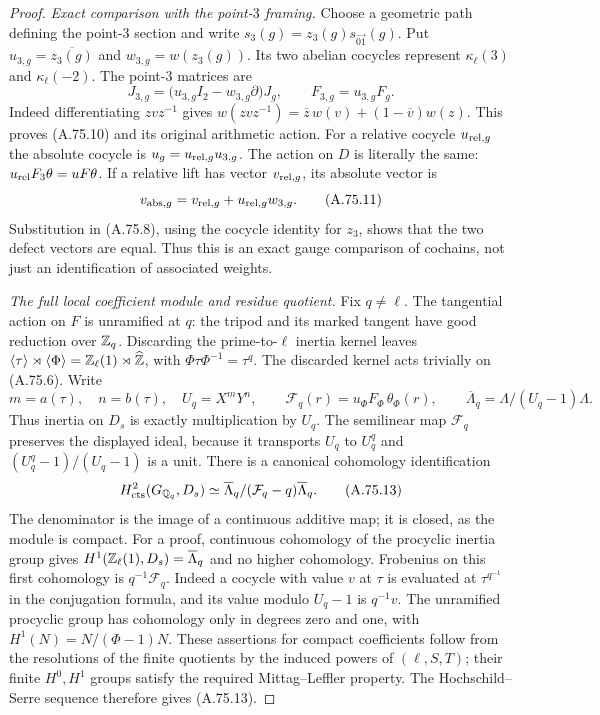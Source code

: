 \begin{proof}
\emph{Exact comparison with the point-$3$ framing.}
Choose a geometric path defining the point-$3$ section and write
$s_3(g)=z_3(g)s_{\overrightarrow{01}}(g)$.
Put $u_{3,g}=\overline{z_3(g)}$ and $w_{3,g}=w(z_3(g))$.
Its two abelian cocycles represent $\kappa_\ell(3)$ and
$\kappa_\ell(-2)$.
The point-$3$ matrices are
\[
 J_{3,g}=\bigl(u_{3,g}I_2-w_{3,g}\partial\bigr)J_g,
                    \qquad F_{3,g}=u_{3,g}F_g .
 \tag{A.75.10}
\]
Indeed differentiating $zvz^{-1}$ gives
$w(zvz^{-1})=\overline z\,w(v)+(1-\overline v)w(z)$.
This proves (A.75.10) and its original arithmetic action.
For a relative cocycle $u_{{\rm rel},g}$ the absolute cocycle is
$u_g=u_{{\rm rel},g}u_{3,g}$.
The action on $D$ is literally the same:
$u_{\rm rel}F_3\theta=uF\theta$.
If a relative lift has vector $v_{{\rm rel},g}$, its absolute
vector is
\[
            v_{{\rm abs},g}
                 =v_{{\rm rel},g}+u_{{\rm rel},g}w_{3,g}.
 \tag{A.75.11}
\]
Substitution in (A.75.8), using the cocycle identity for $z_3$,
shows that the two defect vectors are equal.
Thus this is an exact gauge comparison of cochains, not just
an identification of associated weights.

\emph{The full local coefficient module and residue quotient.}
Fix $q\ne\ell$.  The tangential action on $F$ is unramified at
$q$: the tripod and its marked tangent have good reduction
over $\mathbb Z_q$.
Discarding the prime-to-$\ell$ inertia kernel leaves
$\langle\tau\rangle\rtimes\langle\Phi\rangle
 =\mathbb Z_\ell(1)\rtimes\widehat{\mathbb Z}$, with
$\Phi\tau\Phi^{-1}=\tau^q$.
The discarded kernel acts trivially on (A.75.6).
Write
\[
 m=a(\tau),\quad n=b(\tau),\quad
 U_q=X^mY^n,\qquad
 \mathcal F_q(r)=u_\Phi F_\Phi\,\theta_\Phi(r),\qquad
                    \overline\Lambda_q=\Lambda/(U_q-1)\Lambda .
 \tag{A.75.12}
\]
Thus inertia on $D_s$ is exactly multiplication by $U_q$.
The semilinear map $\mathcal F_q$ preserves the displayed
ideal, because it transports $U_q$ to $U_q^q$ and
$(U_q^q-1)/(U_q-1)$ is a unit.
There is a canonical cohomology identification
\[
 H^2_{\rm cts}(G_{\mathbb Q_q},D_s)
   \simeq
 \overline\Lambda_q/
           (\mathcal F_q-q)\overline\Lambda_q .
 \tag{A.75.13}
\]
The denominator is the image of a continuous additive map;
it is closed, as the module is compact.
For a proof, continuous cohomology of the procyclic inertia
group gives
$H^1(\mathbb Z_\ell(1),D_s)=\overline\Lambda_q$ and no higher
cohomology.  Frobenius on this first cohomology is
$q^{-1}\mathcal F_q$.
Indeed a cocycle with value $v$ at $\tau$ is evaluated at
$\tau^{q^{-1}}$ in the conjugation formula, and its value
modulo $U_q-1$ is $q^{-1}v$.
The unramified procyclic group has cohomology only in
degrees zero and one, with $H^1(N)=N/(\Phi-1)N$.
These assertions for compact coefficients follow from the
resolutions of the finite quotients by the induced powers
of $(\ell,S,T)$; their finite $H^0,H^1$ groups satisfy the
required Mittag--Leffler property.
The Hochschild--Serre sequence therefore gives (A.75.13).


\end{proof}
